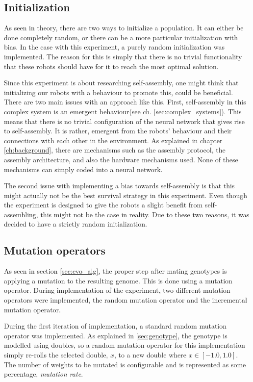 \subsection{Initialization}
As seen in theory, there are two ways to initialize a population. 
It can either be done completely random, or there can be a more particular initialization with bias. 
In the case with this experiment, a purely random initialization was implemented.
The reason for this is simply that there is no trivial functionality that these robots should have for it to reach the most optimal solution.

Since this experiment is about researching self-assembly, one might think that initializing our robots with a behaviour to promote this, could be beneficial.
There are two main issues with an approach like this.
First, self-assembly in this complex system is an emergent behaviour(see ch. \ref{sec:complex_systems}).
This means that there is no trivial configuration of the neural network that gives rise to self-assembly.
It is rather, emergent from the robots' behaviour and their connections with each other in the environment.
As explained in chapter \ref{ch:background}, there are mechanisms such as the assembly protocol, the assembly architecture, and also the hardware mechanisms used.
None of these mechanisms can simply coded into a neural network.

The second issue with implementing a bias towards self-assembly is that this might actually not be the best survival strategy in this experiment.
Even though the experiment is designed to give the robots a slight benefit from self-assembling, this might not be the case in reality.
Due to these two reasons, it was decided to have a strictly random initialization.

\subsection{Mutation operators}
\label{mutation_operators}
As seen in section \ref{sec:evo_alg}, the proper step after mating genotypes is applying a mutation to the resulting genome.
This is done using a mutation operator.
During implementation of the experiment, two different mutation operators were implemented, the random mutation operator and the incremental mutation operator.

During the first iteration of implementation, a standard random mutation operator was implemented.
As explained in \ref{sec:genotype}, the genotype is modelled using doubles, so a random mutation operator for this implementation simply re-rolls the selected double, $x$, to a new double where $x \in [-1.0, 1.0]$. 
The number of weights to be mutated is configurable and is represented as some percentage, \emph{mutation rate}.

